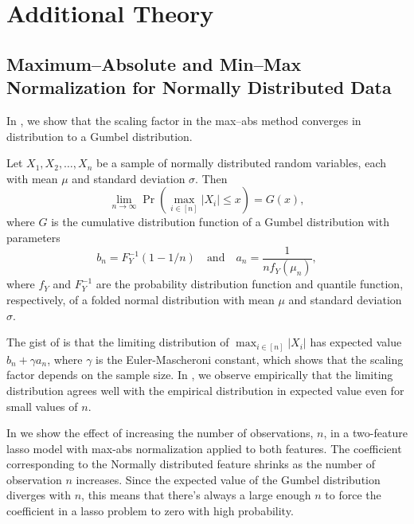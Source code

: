 \section{Additional Theory}
\label{sec:additional-theory}

\subsection{Maximum--Absolute and Min--Max Normalization for Normally Distributed Data}%
\label{sec:maxabs-theory}

In , we show that the scaling factor in the max--abs method converges
in distribution to a Gumbel distribution.

\begin{theorem}
  \label{thm:maxabs-gev}
  Let \(X_1, X_2, \dots, X_n\) be a sample of normally distributed random variables, each with mean \(\mu\) and standard deviation \(\sigma\). Then
  \[
    \lim_{n \rightarrow \infty}\Pr\left(\max_{i \in [n]} |X_i| \leq x\right) = G(x),
  \]
  where \(G\) is the cumulative distribution function of a Gumbel distribution with
  parameters
  \[
    b_n = F_Y^{-1}(1 - 1/n)\quad \text{and} \quad a_n = \frac{1}{n f_Y(\mu_n)},
  \]
  where \(f_Y\) and \(F_Y^{-1}\) are the probability distribution function and quantile
  function, respectively, of a folded normal distribution with mean \(\mu\) and standard
  deviation \(\sigma\).
\end{theorem}

The gist of  is that the limiting distribution of \(\max_{i \in
  [n]}|X_i|\) has expected value \(b_n + \gamma a_n\), where \(\gamma\) is the
Euler-Mascheroni constant, which shows that the scaling factor depends on the sample size.
In , we observe empirically that the limiting distribution agrees well
with the empirical distribution in expected value even for small values of \(n\).

In  we show the effect of increasing the number of observations, \(n\),
in a two-feature lasso model with max-abs normalization applied to both features. The
coefficient corresponding to the Normally distributed feature shrinks as the number of
observation \(n\) increases. Since the expected value of the Gumbel distribution diverges
with \(n\), this means that there's always a large enough \(n\) to force the coefficient in
a lasso problem to zero with high probability.

